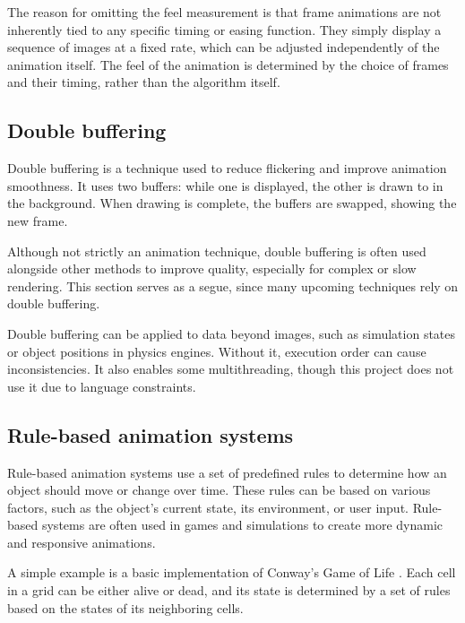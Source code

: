 The reason for omitting the feel measurement is that frame animations are not inherently tied to any specific timing or easing function. They simply display a sequence of images at a fixed rate, which can be adjusted independently of the animation itself. The feel of the animation is determined by the choice of frames and their timing, rather than the algorithm itself.

\vspace{30pt}

\subsection{Double buffering}
\label{subsec:double-buffering}

Double buffering is a technique used to reduce flickering and improve animation smoothness. It uses two buffers: while one is displayed, the other is drawn to in the background. When drawing is complete, the buffers are swapped, showing the new frame.

Although not strictly an animation technique, double buffering is often used alongside other methods to improve quality, especially for complex or slow rendering. This section serves as a segue, since many upcoming techniques rely on double buffering.

\begin{Note}
    Double buffering can be applied to data beyond images, such as simulation states or object positions in physics engines. Without it, execution order can cause inconsistencies. It also enables some multithreading, though this project does not use it due to language constraints.
\end{Note}

\pagebreak

\subsection{Rule-based animation systems}
\label{subsec:rule-based-animation-systems}

Rule-based animation systems use a set of predefined rules to determine how an object should move or change over time. These rules can be based on various factors, such as the object's current state, its environment, or user input. Rule-based systems are often used in games and simulations to create more dynamic and responsive animations.

A simple example is a basic implementation of Conway's Game of Life \cite{conway}. Each cell in a grid can be either alive or dead, and its state is determined by a set of rules based on the states of its neighboring cells.


